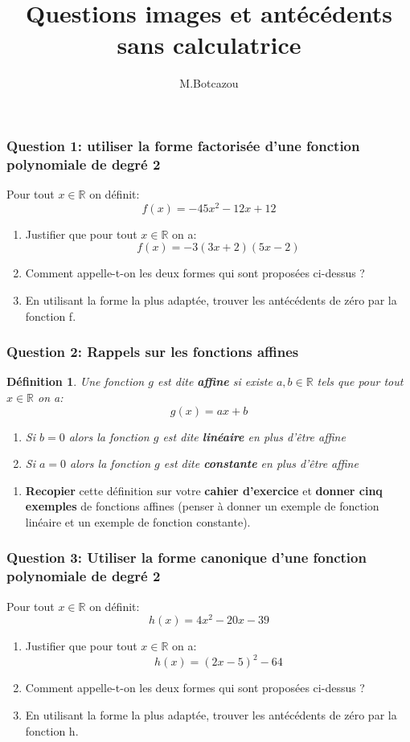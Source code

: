 \documentclass[t,12pt]{beamer}
\title{Questions images et antécédents sans calculatrice}
\author{M.Botcazou}
\date{}
\newtheorem{defi}{Définition}
\newcommand{\R}{\mathbb{R}}
\begin{document}
\maketitle	

\begin{frame}
	\frametitle{Question 1: utiliser la forme factorisée d'une fonction polynomiale de degré 2}
	Pour tout  $x\in\R$ on définit: $$f(x)= -45x^2 -12x+12$$ 
	\begin{enumerate}
		\item Justifier que pour tout $x\in\R$ on a: $$f(x)= -3(3x+2)(5x-2)$$ 
		\item Comment appelle-t-on les deux formes qui sont proposées ci-dessus ?
		\item En utilisant la forme la plus adaptée, trouver les antécédents de zéro par la fonction f. 
	\end{enumerate}

\end{frame}

\begin{frame}
\frametitle{Question 2: Rappels sur les fonctions affines}
\begin{defi} 
	Une fonction $g$ est dite \textbf{affine} si existe $a,b\in\R$ tels que pour tout  $x\in\R$ on a: $$g(x) = ax +b$$ 
	\begin{enumerate}[$\square$]
		\item Si $b=0$ alors la fonction $g$ est dite \textbf{linéaire} en plus d'être affine
		\item Si $a=0$ alors la fonction $g$ est dite \textbf{constante} en plus d'être affine
	\end{enumerate}
\end{defi}
	\begin{enumerate}
	\item \textbf{Recopier} cette définition sur votre \textbf{cahier d'exercice} et \textbf{donner cinq exemples} de fonctions affines (penser à donner un exemple de fonction linéaire et un exemple de fonction constante).   
	
\end{enumerate}

\end{frame}

\begin{frame}
	\frametitle{Question 3: Utiliser la forme canonique d'une fonction polynomiale de degré 2 }
	Pour tout  $x\in\R$ on définit: $$h(x)= 4x^2 -20x - 39$$ 
	\begin{enumerate}
		\item Justifier que pour tout $x\in\R$ on a: $$h(x)=(2x-5)^2-64$$ 
		\item Comment appelle-t-on les deux formes qui sont proposées ci-dessus ?
		\item En utilisant la forme la plus adaptée, trouver les antécédents de zéro par la fonction h. 
	\end{enumerate}

\end{frame}
\end{document}

